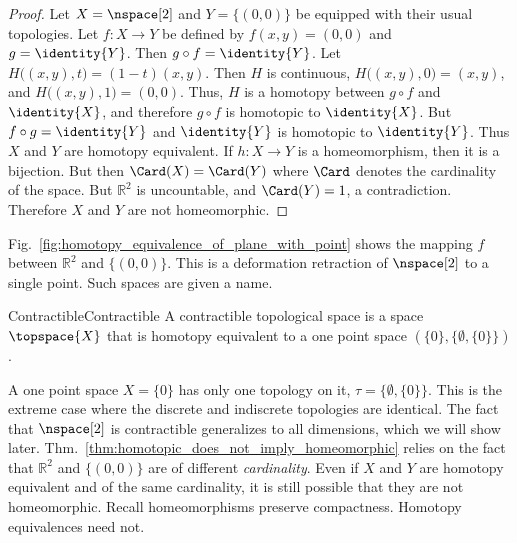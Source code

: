 \documentclass{book}                                                           %
\begin{document}
                \begin{proof}
                    Let $X=\nspace[2]$ and $Y=\{(0,0)\}$ be equipped with their
                    usual topologies. Let $f:X\rightarrow{Y}$ be defined by
                    $f(x,y)=(0,0)$ and $g=\identity{Y}$. Then
                    $g\circ{f}=\identity{Y}$. Let
                    $H\big((x,y),t\big)=(1-t)(x,y)$. Then $H$ is continuous,
                    $H\big((x,y),0\big)=(x,y)$, and $H\big((x,y),1\big)=(0,0)$.
                    Thus, $H$ is a homotopy between ${g}\circ{f}$ and
                    $\identity{X}$, and therefore ${g}\circ{f}$ is homotopic to
                    $\identity{X}$. But ${f}\circ{g}=\identity{Y}$ and
                    $\identity{Y}$ is homotopic to $\identity{Y}$. Thus $X$ and
                    $Y$ are homotopy equivalent. If $h:{X}\rightarrow{Y}$ is a
                    homeomorphism, then it is a bijection. But then
                    $\Card(X)=\Card(Y)$ where $\Card$ denotes the cardinality
                    of the space. But $\mathbb{R}^{2}$ is uncountable, and
                    $\Card(Y)=1$, a contradiction. Therefore $X$ and $Y$ are not
                    homeomorphic.
                \end{proof}
                Fig.~\ref{fig:homotopy_equivalence_of_plane_with_point}
                shows the mapping $f$ between $\mathbb{R}^{2}$ and $\{(0,0)\}$.
                This is a deformation retraction of $\nspace[2]$ to a single
                point. Such spaces are given a name.
                \begin{fdefinition}{Contractible}{Contractible}
                    A contractible topological space is a space $\topspace{X}$
                    that is homotopy equivalent to a one point space
                    $(\{0\},\{\emptyset,\{0\}\})$.
                \end{fdefinition}
                \par
                \begin{minipage}{0.54\textwidth}
                    A one point space $X=\{0\}$ has only one topology on it,
                    $\tau=\{\emptyset,\{0\}\}$. This is the extreme case where
                    the discrete and indiscrete topologies are identical. The
                    fact that $\nspace[2]$ is contractible generalizes to all
                    dimensions, which we will show later.
                    Thm.~\ref{thm:homotopic_does_not_imply_homeomorphic} relies
                    on the fact that $\mathbb{R}^{2}$ and $\{(0,0)\}$ are of
                    different \textit{cardinality}. Even if $X$ and $Y$ are
                    homotopy equivalent and of the same cardinality, it is still
                    possible that they are not homeomorphic. Recall
                    homeomorphisms preserve compactness. Homotopy equivalences
                    need not.
                \end{minipage}
\end{document}
